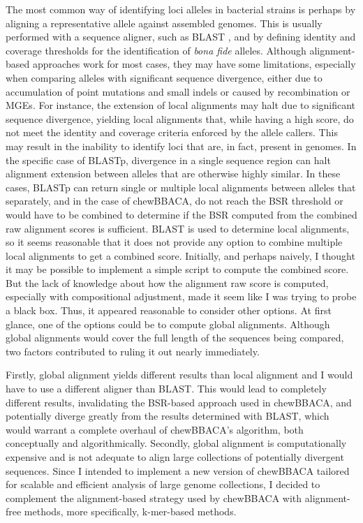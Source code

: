 The most common way of identifying loci alleles in bacterial strains is perhaps by aligning a representative allele against assembled genomes. This is usually performed with a sequence aligner, such as \ac{BLAST} \cite{camacho_blast_2009}, and by defining identity and coverage thresholds for the identification of \textit{bona fide} alleles. Although alignment-based approaches work for most cases, they may have some limitations, especially when comparing alleles with significant sequence divergence, either due to accumulation of point mutations and small indels or caused by recombination or \ac{MGEs}. For instance, the extension of local alignments may halt due to significant sequence divergence, yielding local alignments that, while having a high score, do not meet the identity and coverage criteria enforced by the allele callers. This may result in the inability to identify loci that are, in fact, present in genomes. In the specific case of \ac{BLASTp}, divergence in a single sequence region can halt alignment extension between alleles that are otherwise highly similar. In these cases, \ac{BLASTp} can return single or multiple local alignments between alleles that separately, and in the case of chewBBACA, do not reach the \ac{BSR} threshold or would have to be combined to determine if the \ac{BSR} computed from the combined raw alignment scores is sufficient. BLAST is used to determine local alignments, so it seems reasonable that it does not provide any option to combine multiple local alignments to get a combined score. Initially, and perhaps naively, I thought it may be possible to implement a simple script to compute the combined score. But the lack of knowledge about how the alignment raw score is computed, especially with compositional adjustment, made it seem like I was trying to probe a black box. Thus, it appeared reasonable to consider other options. At first glance, one of the options could be to compute global alignments. Although global alignments would cover the full length of the sequences being compared, two factors contributed to ruling it out nearly immediately.

Firstly, global alignment yields different results than local alignment and I would have to use a different aligner than BLAST. This would lead to completely different results, invalidating the BSR-based approach used in chewBBACA, and potentially diverge greatly from the results determined with BLAST, which would warrant a complete overhaul of chewBBACA's algorithm, both conceptually and algorithmically. Secondly, global alignment is computationally expensive and is not adequate to align large collections of potentially divergent sequences. Since I intended to implement a new version of chewBBACA tailored for scalable and efficient analysis of large genome collections, I decided to complement the alignment-based strategy used by chewBBACA with alignment-free methods, more specifically, k-mer-based methods.

